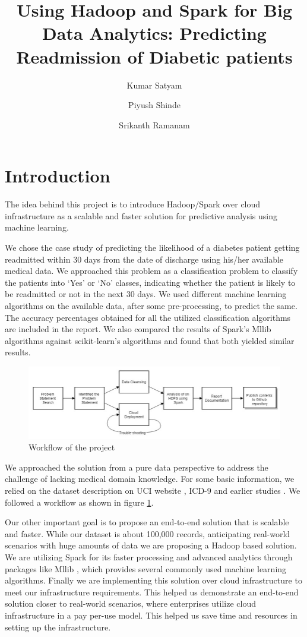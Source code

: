 \documentclass[9pt,twocolumn,twoside]{../../styles/osajnl}
\title{Using Hadoop and Spark for Big Data Analytics: Predicting Readmission of Diabetic patients}
\author[1,*]{Kumar Satyam}
\author[1,**]{Piyush Shinde}
\author[1,***]{Srikanth Ramanam}
\affil[1]{School of Informatics and Computing, Bloomington, IN 47408, U.S.A.}
\affil[*]{Corresponding authors: ksatyam@indiana.edu}
\affil[**]{Corresponding authors: pshinde@iu.edu}
\affil[***]{Corresponding authors: srikrama@iu.edu}
\begin{document}
\maketitle

\tableofcontents %

\section{Introduction}
The idea behind this project is to introduce Hadoop/Spark over cloud infrastructure as a scalable and faster solution for predictive analysis using machine learning.

We chose the case study of predicting the likelihood of a diabetes patient getting readmitted within 30 days from the date of discharge using his/her available medical data. We approached this problem as a classification problem to classify the patients into  ‘Yes’ or ‘No’  classes, indicating whether the patient is likely to be readmitted or not in the next 30 days. We used different machine learning algorithms on the available data, after some pre-processing, to predict the same. The accuracy percentages obtained for all the utilized classification algorithms are included in the report. We also compared the results of Spark's Mllib algorithms against scikit-learn's algorithms and found that both yielded similar results.	

\begin{figure}[h]\centering
\includegraphics[width=\linewidth]{images/Workflow}
\caption{Workflow of the project}
\label{fig:workflow}
\end{figure}

We approached the solution from a pure data perspective to address the challenge of lacking medical domain knowledge. For some basic information, we relied on the dataset description on UCI website \cite{www-dataset}, ICD-9 \cite{www-icd9} and earlier studies \cite{article-hindawi}. We followed a workflow as shown in figure \ref{fig:workflow}. 

Our other important goal is to propose an end-to-end solution that is scalable and faster. While our dataset is about 100,000 records, anticipating real-world scenarios with huge amounts of data we are proposing a Hadoop based solution. We are utilizing Spark for its faster processing \cite{www-sparkfast} and  advanced analytics through packages like Mllib \cite{www-mllib}, which provides several commonly used machine learning algorithms. Finally we are implementing this solution over cloud infrastructure to meet our infrastructure requirements. This helped us demonstrate an end-to-end solution closer to real-world scenarios, where enterprises utilize cloud infrastructure in a pay per-use model. This helped us save time and resources in setting up the infrastructure.
\end{document}
